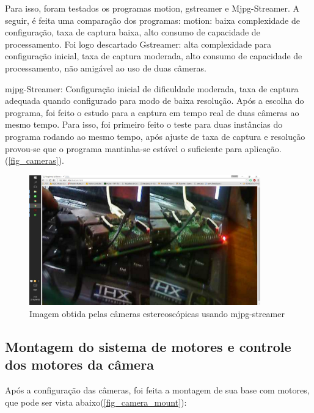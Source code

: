 Para isso, foram testados os programas motion, gstreamer e Mjpg-Streamer. A seguir,  é feita uma comparação dos programas:
motion: baixa complexidade de configuração, taxa de captura baixa, alto consumo de capacidade de processamento. Foi logo descartado
Gstreamer: alta complexidade para configuração inicial, taxa de captura moderada, alto consumo de capacidade de processamento, não amigável ao uso de duas câmeras.\par
mjpg-Streamer: Configuração inicial de dificuldade moderada, taxa de captura adequada quando configurado para modo de baixa resolução.
Após a escolha do programa, foi feito o estudo para a captura em tempo real de duas câmeras ao mesmo tempo. Para isso, foi primeiro feito o teste para duas instâncias do programa rodando ao mesmo tempo, após ajuste de taxa de captura e resolução provou-se que o programa mantinha-se estável o suficiente para aplicação. (\autoref{fig_cameras}).\par

\begin{figure}[h!]
	\caption{\label{fig_cameras}  Imagem obtida pelas câmeras estereoscópicas usando mjpg-streamer}
	\begin{center}
		\includegraphics[width=100mm]{13898174_1266308583399952_1266040180_o.png}	
	\end{center}
\end{figure}




\subsection{Montagem do sistema de motores e controle dos motores da câmera}\label{subsec-motores-camera}

Após a configuração das câmeras, foi feita a montagem de sua base com motores, que pode ser vista abaixo(\autoref{fig_camera_mount}): 

